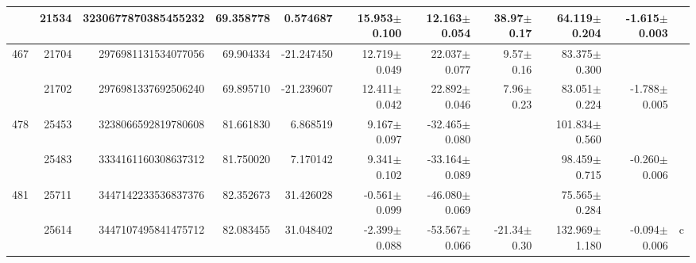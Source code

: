 \documentclass{ws-ijmpd}
\begin{document}
\begin{landscape}
\begin{longtable}{rrrrrrrrrrl}
            &   21534 &      3230677870385455232 &                    69.358778 &                     0.574687 &                 15.953$\pm$0.100 &                 12.163$\pm$0.054 &          38.97$\pm$  0.17 &        64.119$\pm$0.204 &                          -1.615$\pm$0.003 &                                                    \\
 \hline 467 &   21704 &      2976981131534077056 &                    69.904334 &                   -21.247450 &                 12.719$\pm$0.049 &                 22.037$\pm$0.077 &           9.57$\pm$  0.16 &        83.375$\pm$0.300 &                                           &                                                    \\
            &   21702 &      2976981337692506240 &                    69.895710 &                   -21.239607 &                 12.411$\pm$0.042 &                 22.892$\pm$0.046 &           7.96$\pm$  0.23 &        83.051$\pm$0.224 &                          -1.788$\pm$0.005 &                                                    \\
 \hline 478 &   25453 &      3238066592819780608 &                    81.661830 &                     6.868519 &                  9.167$\pm$0.097 &                -32.465$\pm$0.080 &                           &       101.834$\pm$0.560 &                                           &                                                    \\
            &   25483 &      3334161160308637312 &                    81.750020 &                     7.170142 &                  9.341$\pm$0.102 &                -33.164$\pm$0.089 &                           &        98.459$\pm$0.715 &                          -0.260$\pm$0.006 &                                                    \\
 \hline 481 &   25711 &      3447142233536837376 &                    82.352673 &                    31.426028 &                 -0.561$\pm$0.099 &                -46.080$\pm$0.069 &                           &        75.565$\pm$0.284 &                                           &                                                    \\
            &   25614 &      3447107495841475712 &                    82.083455 &                    31.048402 &                 -2.399$\pm$0.088 &                -53.567$\pm$0.066 &         -21.34$\pm$  0.30 &       132.969$\pm$1.180 &                          -0.094$\pm$0.006 &                                                  c \\

\end{longtable}
\end{landscape}
\end{document}
